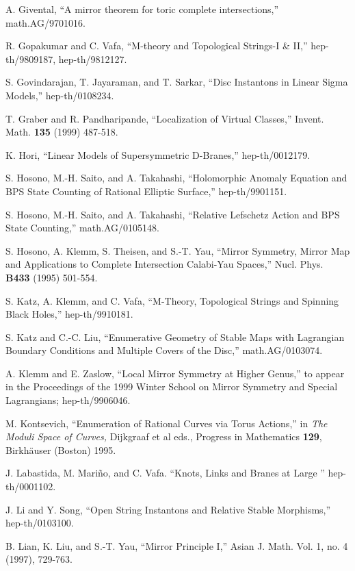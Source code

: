 \documentclass[a4paper,11pt]{article}
\begin{document}
\begin{thebibliography}{99}
 A. Givental, 
``A mirror theorem for toric complete intersections,'' math.AG/9701016.

 R. Gopakumar and C. Vafa,
``M-theory and
Topological Strings-I \& II,''
hep-th/9809187, hep-th/9812127.

S. Govindarajan, T. Jayaraman, and T. Sarkar,
``Disc Instantons in Linear Sigma Models,''
hep-th/0108234.

 T. Graber and R. Pandharipande, 
``Localization
of Virtual Classes,'' 
Invent. Math. {\bf 135} (1999) 487-518.

 K. Hori,
``Linear Models of Supersymmetric D-Branes,''
hep-th/0012179.

S. Hosono, M.-H. Saito, and A. Takahashi,
``Holomorphic Anomaly Equation and BPS State
Counting of Rational Elliptic Surface,''
hep-th/9901151.

S. Hosono, M.-H. Saito, and A. Takahashi,
``Relative Lefschetz Action and BPS State Counting,''
math.AG/0105148.

S. Hosono, A. Klemm, S. Theisen, and S.-T. Yau,
``Mirror Symmetry, Mirror Map and Applications
to Complete Intersection Calabi-Yau Spaces,''
Nucl. Phys. {\bf B433} (1995) 501-554. 

 S. Katz, A. Klemm, and C. Vafa,
``M-Theory, Topological Strings and Spinning Black Holes,''
hep-th/9910181.

 S. Katz and C.-C. Liu,
``Enumerative Geometry of Stable Maps with
Lagrangian Boundary Conditions and
Multiple Covers of the Disc,''
math.AG/0103074.

 A. Klemm and E. Zaslow,
``Local Mirror Symmetry at Higher Genus,''
to appear in the Proceedings of the 1999 Winter School
on Mirror Symmetry and Special Lagrangians;
hep-th/9906046.

M. Kontsevich, ``Enumeration of Rational Curves
via Torus Actions,'' in {\sl The Moduli Space of Curves,}
Dijkgraaf et al eds., Progress in Mathematics {\bf 129},
Birkh\"auser (Boston) 1995.

 J. Labastida, M. Mari\~no, and C. Vafa.
``Knots, Links and Branes at Large \coordHE{}''
hep-th/0001102.

 J. Li and Y. Song,
``Open String Instantons and Relative Stable
Morphisms,'' hep-th/0103100.

 B. Lian, K. Liu, and S.-T. Yau, 
``Mirror Principle I,'' Asian J. Math.  Vol. 1, 
no. 4 (1997), 729-763.


\end{thebibliography}
\end{document}
